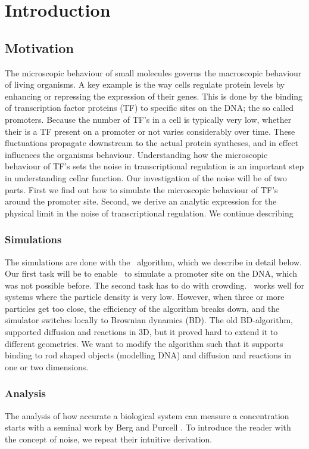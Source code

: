 \section{Introduction}

\subsection{Motivation}
The microscopic behaviour of small molecules governs the macroscopic behaviour of living organisms. A key example is the way cells regulate protein levels by enhancing or repressing the expression of their genes. This is done by the binding of transcription factor proteins (TF) to specific sites on the DNA; the so called promoters. Because the number of TF's in a cell is typically very low, whether their is a TF present on a promoter or not varies considerably over time. These fluctuations propagate downstream to the actual protein syntheses, and in effect influences the organisms behaviour. Understanding how the microscopic behaviour of TF's sets the noise in transcriptional regulation is an important step in understanding cellar function. Our investigation of the noise will be of two parts. First we find out how to simulate the microscopic behaviour of TF's around the promoter site. Second, we derive an analytic expression for the physical limit in the noise of transcriptional regulation. We continue describing 

\subsubsection{Simulations}
The simulations are done with the \GFRD\, algorithm, which we describe in detail below. Our first task will be to enable \GFRD\, to simulate a promoter site on the DNA, which was not possible before. The second task has to do with crowding. \GFRD\, works well for systems where the particle density is very low. However, when three or more particles get too close, the efficiency of the algorithm breaks down, and the simulator switches locally to Brownian dynamics (BD). The old BD-algorithm, supported diffusion and reactions in 3D, but it proved hard to extend it to different geometries. We want to modify the algorithm such that it supports binding to rod shaped objects (modelling DNA) and diffusion and reactions in one or two dimensions.

\subsubsection{Analysis}
The analysis of how accurate a biological system can measure a concentration starts with a seminal work by Berg and Purcell \cite{Berg1977}. To introduce the reader with the concept of noise, we repeat their intuitive derivation. 

